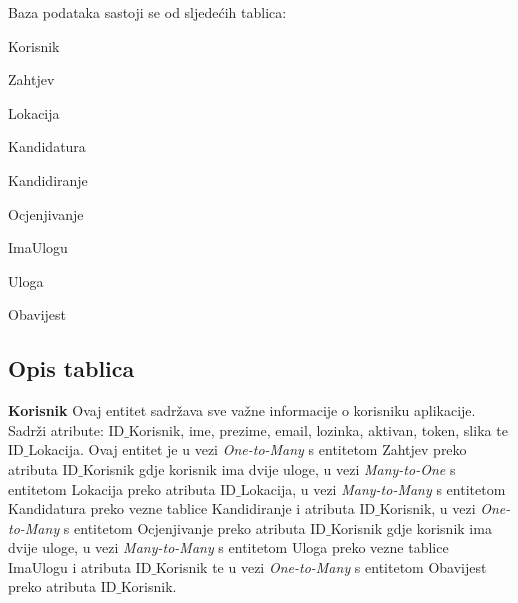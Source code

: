 		Baza podataka sastoji se od sljedećih tablica:
		
		\begin{packed_item}
			\item Korisnik
			\item Zahtjev
			\item Lokacija
			\item Kandidatura
			\item Kandidiranje
			\item Ocjenjivanje
			\item ImaUlogu 
			\item Uloga
			\item Obavijest
			
		\end{packed_item}
		
			\subsection{Opis tablica}
			
					    \textbf{ Korisnik}
		    \text Ovaj entitet sadržava sve važne informacije o korisniku aplikacije. Sadrži atribute: ID${\_}$Korisnik, ime, prezime, email, lozinka, aktivan, token, slika te ID${\_}$Lokacija. Ovaj entitet je u vezi \emph{One-to-Many} s entitetom Zahtjev preko atributa ID${\_}$Korisnik gdje korisnik ima dvije uloge, u vezi  \emph{Many-to-One} s entitetom Lokacija preko atributa ID${\_}$Lokacija, u vezi \emph{Many-to-Many} s entitetom Kandidatura preko vezne tablice Kandidiranje i atributa ID${\_}$Korisnik, u vezi \emph{One-to-Many} s entitetom Ocjenjivanje preko atributa ID${\_}$Korisnik gdje korisnik ima dvije uloge, u vezi \emph{Many-to-Many} s entitetom Uloga preko vezne tablice ImaUlogu i atributa ID${\_}$Korisnik te u vezi \emph{One-to-Many} s entitetom Obavijest preko atributa ID${\_}$Korisnik.
				
